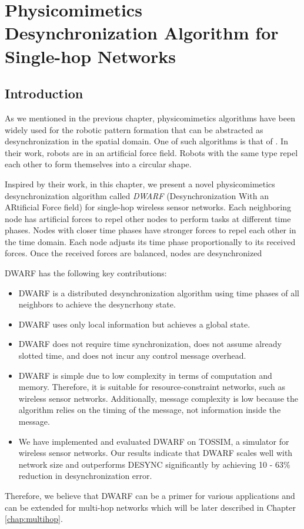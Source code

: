 \chapter{Physicomimetics Desynchronization Algorithm for Single-hop Networks}
\label{chap:algo}

\section{Introduction}
\label{sec:intro-dwarf}
As we mentioned in the previous chapter, physicomimetics algorithms have been widely used for the robotic pattern formation that can be abstracted as desynchronization in the spatial domain.
One of such algorithms is that of \cite{4141997}. In their work, robots are in an artificial force field. Robots with the same type repel each other to form themselves into a circular shape. 

Inspired by their work, in this chapter, we present a novel physicomimetics desynchronization algorithm called \textit{DWARF} (Desynchronization With an ARtificial Force field) for single-hop wireless sensor networks.
Each neighboring node has artificial forces to repel other nodes to perform tasks at different time phases. Nodes with closer time phases have stronger forces to repel each other in the time domain. Each node adjusts its time phase proportionally to its received forces. Once the received forces are balanced, nodes are desynchronized

DWARF has the following key contributions:
\begin{itemize}
\item DWARF is a distributed desynchronization algorithm using time phases of all neighbors to achieve the desyncrhony state. 
\item DWARF uses only local information but achieves a global state.
\item DWARF does not require time synchronization, does not assume already slotted time, and does not incur any control message overhead.
\item DWARF is simple due to low complexity in terms of computation and memory. Therefore, it is suitable for resource-constraint networks, such as wireless sensor networks. Additionally, message complexity is low because the algorithm relies on the timing of the message, not information inside the message.
\item We have implemented and evaluated DWARF on TOSSIM, a simulator for wireless sensor networks. Our results indicate that DWARF scales well with network size and outperforms DESYNC significantly by achieving 10 - 63\% reduction in desynchronization error.
\end{itemize}
Therefore, we believe that DWARF can be a primer for various applications and can be extended for multi-hop networks which will be later described in Chapter \ref{chap:multihop}.

